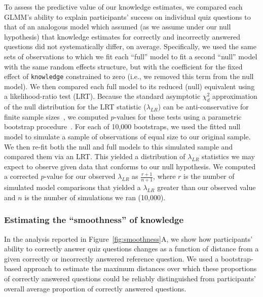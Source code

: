 \documentclass[10pt]{article}
\begin{document}
To assess the predictive value of our knowledge estimates, we compared each
GLMM's ability to explain participants' success on individual quiz questions to
that of an analogous model which assumed (as we assume under our null
hypothesis) that knowledge estimates for correctly and incorrectly answered
questions did not systematically differ, on average. Specifically, we
used the same sets of observations to which we fit each ``full'' model to fit
a second ``null'' model with the same random effects structure, but with
the coefficient for the fixed effect of \texttt{knowledge} constrained to zero
(i.e., we removed this term from the null model). We then compared each full
model to its reduced (null) equivalent using a likelihood-ratio test (LRT).
Because the standard asymptotic $\chi^2_d$ approximation of the null
distribution for the LRT statistic ($\lambda_{LR}$) can be anti-conservative for
finite sample sizes~\citep{GoldSimo00,ScheEtal08b,SnijBosk11}, we computed
$p$-values for these tests using a parametric bootstrap
procedure~\citep{DaviHink97,HaleHojs14}. For each of 10,000 bootstraps, we used
the fitted null model to simulate a sample of observations of equal size to our
original sample. We then re-fit both the null and full models to this simulated
sample and compared them via an LRT. This yielded a distribution of
$\lambda_{LR}$ statistics we may expect to observe given data that conforms to
our null hypothesis. We computed a corrected $p$-value for our observed
$\lambda_{LR}$ as $\frac{r+1}{n+1}$, where $r$ is the number of simulated model
comparisons that yielded a $\lambda_{LR}$ greater than our observed value and
$n$ is the number of simulations we ran (10,000).

\subsubsection*{Estimating the ``smoothness'' of knowledge}\label{subsec:smoothness}

In the analysis reported in Figure~\ref{fig:smoothness}A, we show how
participants' ability to correctly answer quiz questions changes as a function
of distance from a given correctly or incorrectly answered reference question.
We used a bootstrap-based approach to estimate the maximum distances over which
these proportions of correctly answered questions could be reliably
distinguished from participants' overall average proportion of correctly
answered questions.
\end{document}
